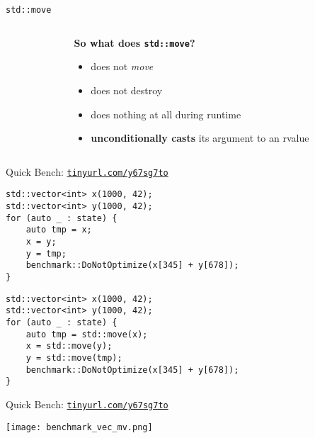 \begin{frame}[fragile]{\texttt{std::move}}
    \begin{columns}
        \begin{column}{.55\textwidth}
        \end{column}
        \begin{column}{.4\textwidth}
            \textbf{So what does \texttt{std::move}?}
            \begin{itemize}
                \item does not \textit{move}
                \item does not destroy
                \item does nothing at all during runtime
                \item \textbf{unconditionally casts} its argument to an rvalue
            \end{itemize}
        \end{column}
    \end{columns}
\end{frame}

\begin{frame}[fragile]{Quick Bench: \href{http://quick-bench.com/7qTMMYSgUJG-lRg-B26ZX77vim0}{\texttt{tinyurl.com/y67sg7to}}}
    \begin{lstlisting}
std::vector<int> x(1000, 42);
std::vector<int> y(1000, 42);
for (auto _ : state) {
    auto tmp = x;
    x = y;
    y = tmp;
    benchmark::DoNotOptimize(x[345] + y[678]);
}
    \end{lstlisting}

    \begin{lstlisting}
std::vector<int> x(1000, 42);
std::vector<int> y(1000, 42);
for (auto _ : state) {
    auto tmp = std::move(x);
    x = std::move(y);
    y = std::move(tmp);
    benchmark::DoNotOptimize(x[345] + y[678]);
}
    \end{lstlisting}
\end{frame}

\begin{frame}{Quick Bench: \href{http://quick-bench.com/7qTMMYSgUJG-lRg-B26ZX77vim0}{\texttt{tinyurl.com/y67sg7to}}}
    \centering

    \texttt{[image: benchmark\_vec\_mv.png]}
\end{frame}

\begin{frame}
    \centering
    \scalebox{3}{Universal References}
\end{frame}

